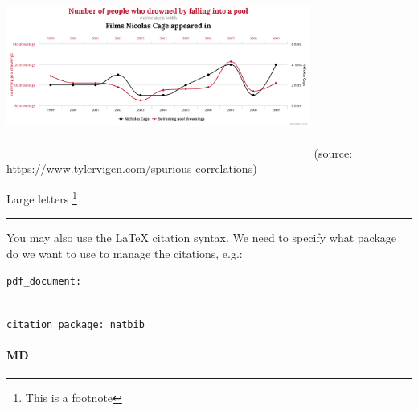 \documentclass[
  11pt,
]{article}
\begin{document}
\begin{center} %
  \includegraphics[width=10cm, height=6cm, keepaspectratio]{img/chart.png}  
(source: https://www.tylervigen.com/spurious-correlations)
\end{center}
\newpage

\Large Large letters \footnote{This is a footnote}

\begin{center}\rule{0.5\linewidth}{0.5pt}\end{center}

You may also use the LaTeX citation syntax. We need to specify what
package do we want to use to manage the citations, e.g.:

\texttt{pdf\_document:}\strut \\
\texttt{citation\_package:\ natbib}

\hypertarget{md}{%
\paragraph{MD}\label{md}}
\end{document}
